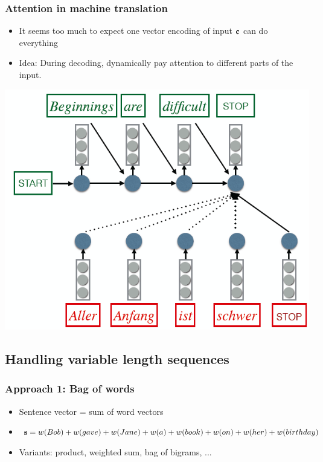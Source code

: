 \documentclass{beamer}
\newcommand{\bi}{\begin{itemize}}
\newcommand{\ei}{\end{itemize}}
\begin{document}
\begin{frame}
\frametitle{Attention in machine translation \cite{bahdanau14translate}}
\bi
\item It seems too much to expect one vector encoding of input $\bf{c}$ can do everything
\item Idea: During decoding, dynamically {\color{red} pay attention} to different parts of the input.
\ei
\centerline{\includegraphics[scale=0.33]{figs/explain_attention4}}
\end{frame}

\subsection[Handling variable length sequences]{Handling variable length sequences}


\begin{frame}
\frametitle{Approach 1: Bag of words}
\bi
\item Sentence vector = sum of word vectors 
\item  ${\bf s} = w(Bob) + w(gave) + w(Jane) + w(a) + w(book) + w(on) + w(her) + w(birthday)$
\item Variants: product, weighted sum, bag of bigrams, ...
\ei
\end{frame}
\end{document}
